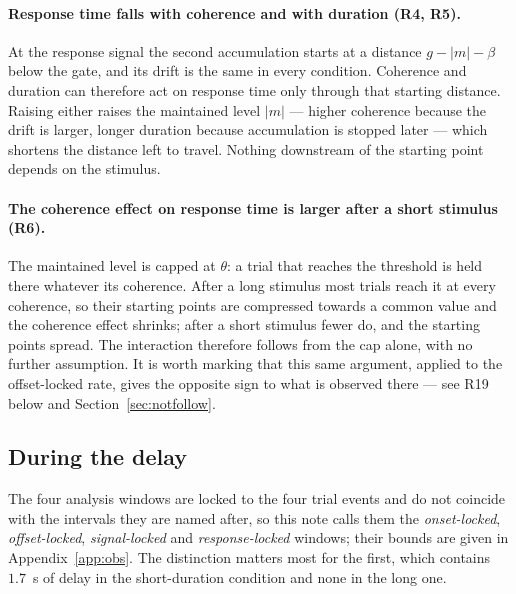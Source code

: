 \documentclass[a4paper,11pt]{article}
\newcommand{\1}{\mathbbm{1}}
\begin{document}
\paragraph{Response time falls with coherence and with duration (R4, R5).} At the response
signal the second accumulation starts at a distance $g-|m|-\beta$ below the gate, and its
drift is the same in every condition. Coherence and duration can therefore act on response
time only through that starting distance. Raising either raises the maintained level
$|m|$ --- higher coherence because the drift is larger, longer duration because
accumulation is stopped later --- which shortens the distance left to travel. Nothing
downstream of the starting point depends on the stimulus.

\paragraph{The coherence effect on response time is larger after a short stimulus (R6).}
The maintained level is capped at $\theta$: a trial that reaches the threshold is held
there whatever its coherence. After a long stimulus most trials reach it at every
coherence, so their starting points are compressed towards a common value and the
coherence effect shrinks; after a short stimulus fewer do, and the starting points spread.
The interaction therefore follows from the cap alone, with no further assumption. It is
worth marking that this same argument, applied to the offset-locked rate, gives the
opposite sign to what is observed there --- see R19 below and
Section~\ref{sec:notfollow}.

\subsection{During the delay}

The four analysis windows are locked to the four trial events and do not coincide with
the intervals they are named after, so this note calls them the \emph{onset-locked},
\emph{offset-locked}, \emph{signal-locked} and \emph{response-locked} windows; their
bounds are given in Appendix~\ref{app:obs}. The distinction matters most for the first,
which contains $1.7$~s of delay in the short-duration condition and none in the long one.
\end{document}
